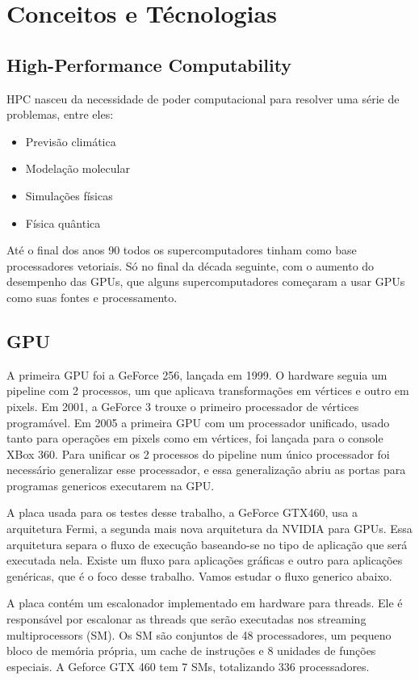 \section{Conceitos e Técnologias}
\subsection{High-Performance Computability}
HPC nasceu da necessidade de poder computacional para resolver uma série de problemas, entre eles:
\begin{itemize}
  \item Previsão climática
  \item Modelação molecular
  \item Simulações físicas
  \item Física quântica
\end{itemize}
Até o final dos anos 90 todos os supercomputadores tinham como base processadores vetoriais. Só no final da década seguinte, 
com o aumento do desempenho das GPUs, que alguns supercomputadores começaram a usar GPUs como suas fontes e processamento.
\subsection{GPU}
A primeira GPU foi a GeForce 256, lançada em 1999. O hardware seguia um pipeline com 2 processos, um que aplicava transformações
em vértices e outro em pixels. Em 2001, a GeForce 3 trouxe o primeiro processador de vértices programável. Em 2005 a primeira
GPU com um processador unificado, usado tanto para operações em pixels como em vértices, foi lançada para o console XBox 360. 
Para unificar os 2 processos do pipeline num único processador foi necessário generalizar esse processador, e essa generalização
abriu as portas para programas genericos executarem na GPU.

A placa usada para os testes desse trabalho, a GeForce GTX460, usa a arquitetura Fermi, a segunda mais nova arquitetura da NVIDIA para
GPUs. Essa arquitetura separa o fluxo de execução baseando-se no tipo de aplicação que será executada nela. Existe um fluxo para
aplicações gráficas e outro para aplicações genéricas, que é o foco desse trabalho. Vamos estudar o fluxo generico abaixo.

A placa contém um escalonador implementado em hardware para threads. Ele é responsável por escalonar as threads que serão
executadas nos streaming multiprocessors (SM). Os SM são conjuntos de 48 processadores, um pequeno bloco de memória própria,
um cache de instruções e 8 unidades de funções especiais. A Geforce GTX 460 tem 7 SMs, totalizando 336 processadores.

